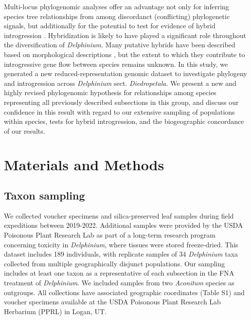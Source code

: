 \documentclass[11pt]{article}
\begin{document}
Multi-locus phylogenomic analyses offer an advantage not only for inferring
species tree relationships from among discordanct (conflicting) phylogenetic signals, 
but additionally for the potential to test for evidence of hybrid introgression
\citep{kubatko_species_2023, durand_testing_2011, eaton_historical_2015}.
% 
Hybridization is likely to have played a significant role throughout the 
diversification of \emph{Delphinium}. 
Many putative hybrids have been described based on morphological descriptions 
\citep{ewan_synopsis_1945, warnock_taxonomic_1995, legro_species_1961, koontz_hybrid_2001},
but the extent to which they contribute to introgressive gene 
flow between species remains unknown.
In this study, we generated a new reduced-representation genomic dataset to 
investigate phylogeny and introgression across \emph{Delphinium} sect. 
\emph{Diedropetala}.
% 
We present a new and highly revised phylogenomic hypothesis for relationships
among species representing all previously described subsections in this 
group, and discuss our confidence in this result with regard to our 
extensive sampling of populations within species, tests for hybrid 
introgression, and the biogeographic concordance of our results.


\section{Materials and Methods}

\subsection{Taxon sampling}
We collected voucher specimens and silica-preserved leaf samples during field expeditions
between 2019-2022. Additional samples were provided by the USDA Poisonous Plant Research
Lab as part of a long-term research program concerning toxicity in \emph{Delphinium}, where
tissues were stored freeze-dried.
% 
This dataset includes 189 individuals, with replicate samples of 34 \emph{Delphinium} 
taxa collected from multiple geographically disjunct populations. Our sampling includes
at least one taxon as a representative of each subsection in the FNA treatment of
\emph{Delphinium}. 
We included samples from two \emph{Aconitum} species as outgroups.
All collections have associated geographic coordinates (Table S1) and voucher 
specimens available at the USDA Poisonous Plant Research Lab Herbarium (PPRL)
in Logan, UT.
\end{document}

